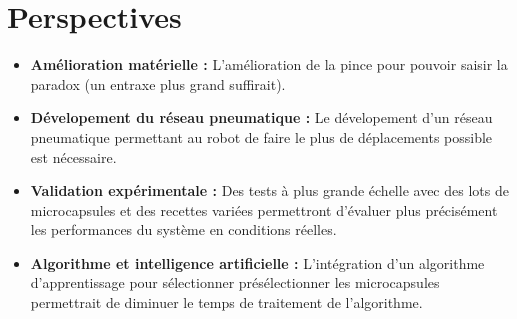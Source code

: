 \section{Perspectives}
\begin{itemize}
    \item \textbf{Amélioration matérielle :} L'amélioration de la pince pour pouvoir saisir la \gls{paradox} (un entraxe plus grand suffirait).
    \item \textbf{Dévelopement du réseau pneumatique :} Le dévelopement d'un réseau pneumatique permettant au robot de faire le plus de déplacements possible est nécessaire.
    \item \textbf{Validation expérimentale :} Des tests à plus grande échelle avec des lots de \glspl{microcapsule} et des recettes variées permettront d'évaluer plus précisément les performances du système en conditions réelles.
    \item \textbf{Algorithme et intelligence artificielle :} L'intégration d'un algorithme d'apprentissage pour sélectionner présélectionner les \glspl{microcapsule} permettrait de diminuer le temps de traitement de l'algorithme.
\end{itemize}
